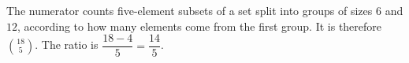 The numerator counts five-element subsets of a set split into groups of sizes $ 6 $ and $ 12 $, according to how many elements come from the first group. It is therefore $\binom{18}{5}$. The ratio is $\dfrac{18-4}{5}=\boxed{\dfrac{14}{5}}$.
